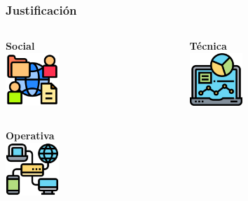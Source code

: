 \documentclass[xcolor=dvipsnames, xcolor=table]{beamer}
\begin{document}
\begin{frame}
    \frametitle{Justificación}
    \vspace{5mm}
    \begin{columns}
      \begin{column}{0.5\textwidth}
        \centering\textbf{\textcolor{color3}{Social}\vspace{3mm}}\\
        \vspace{2mm}
        \includegraphics[width=20mm]{global}
      \end{column}
      \begin{column}{0.5\textwidth}
        \centering\textbf{\textcolor{color3}{Técnica}\vspace{3mm}}\\
        \vspace{2mm}
        \includegraphics[width=20mm]{tecnica}
      \end{column}
    \end{columns}
    \vspace{-2mm}
    \begin{columns}
      \begin{column}{1\textwidth}
        \centering\textbf{\textcolor{color3}{Operativa}\vspace{3mm}}\\
        \vspace{2mm}
        \includegraphics[width=20mm]{local-area}
      \end{column}
    \end{columns}
\end{frame}
\end{document}
